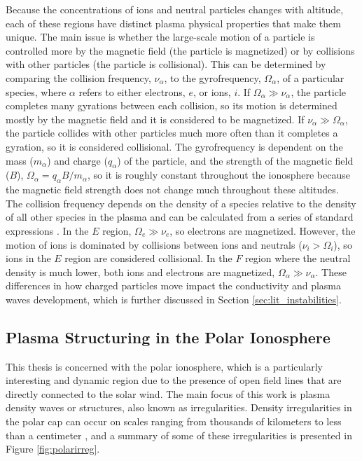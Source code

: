 Because the concentrations of ions and neutral particles changes with altitude, each of these regions have distinct plasma physical properties that make them unique.  The main issue is whether the large-scale motion of a particle is controlled more by the magnetic field (the particle is magnetized) or by collisions with other particles (the particle is collisional).  This can be determined by comparing the collision frequency, \(\nu_\alpha\), to the gyrofrequency, \(\Omega_\alpha\), of a particular species, where \(\alpha\) refers to either electrons, \(e\), or ions, \(i\).  If \(\Omega_\alpha \gg \nu_\alpha\), the particle completes many gyrations between each collision, so its motion is determined mostly by the magnetic field and it is considered to be magnetized.  If \(\nu_\alpha \gg \Omega_\alpha\), the particle collides with other particles much more often than it completes a gyration, so it is considered collisional.  The gyrofrequency is dependent on the mass (\(m_\alpha\)) and charge (\(q_\alpha\)) of the particle, and the strength of the magnetic field (\(B\)), \(\Omega_\alpha = q_\alpha B/m_\alpha\), so it is roughly constant throughout the ionosphere because the magnetic field strength does not change much throughout these altitudes.  The collision frequency depends on the density of a species relative to the density of all other species in the plasma and can be calculated from a series of standard expressions \citep{Schunk1980,Schunk2009}.  In the \(E\) region, \(\Omega_e \gg \nu_e\), so electrons are magnetized.  However, the motion of ions is dominated by collisions between ions and neutrals (\(\nu_i > \Omega_i\)), so ions in the \(E\) region are considered collisional.  In the \(F\) region where the neutral density is much lower, both ions and electrons are magnetized, \(\Omega_\alpha \gg \nu_\alpha\).  These differences in how charged particles move impact the conductivity and plasma waves development, which is further discussed in Section \ref{sec:lit_instabilities}.

\subsection{Plasma Structuring in the Polar Ionosphere}
\label{sec:polar_structure}

This thesis is concerned with the polar ionosphere, which is a particularly interesting and dynamic region due to the presence of open field lines that are directly connected to the solar wind.  The main focus of this work is plasma density waves or structures, also known as irregularities.  Density irregularities in the polar cap can occur on scales ranging from thousands of kilometers to less than a centimeter \citep{Tsunoda1988}, and a summary of some of these irregularities is presented in Figure \ref{fig:polarirreg}.  

